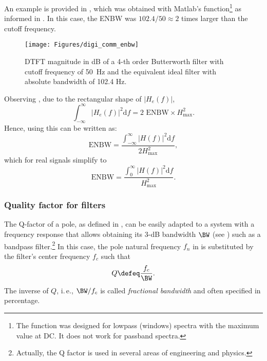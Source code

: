 An example is provided in , which was obtained with Matlab's function\footnote{The function  was designed for lowpass (windows) spectra with the maximum value at DC. It does not work for passband spectra.}  as informed in . In this case, the ENBW was $102.4/50 \approx 2$ times larger than the cutoff frequency. %



\begin{figure}
\centering
\texttt{[image: Figures/digi\_comm\_enbw]}
\caption{DTFT magnitude in dB of a 4-th order Butterworth filter with cutoff frequency of 50~Hz and the equivalent ideal filter with absolute bandwidth of 102.4 Hz.\label{fig:digi_comm_enbw}}
\end{figure}

Observing , due to the rectangular shape of 
$|H_e(f)|$, 
\[
\int_{-\infty}^{\infty} |H_e(f)|^2 \textrm{d}f = 2 \textrm{~ENBW} \times H_{\textrm{max}}^2.
\]
Hence, using  this can be written as:
\begin{equation}
\textrm{ENBW} = \frac{\int_{-\infty}^{\infty} |H(f)|^2 \textrm{d}f}{2H_{\textrm{max}}^2},
\label{eq:enbw}
\end{equation}
which for real signals simplify to
\begin{equation}
\textrm{ENBW} = \frac{\int_{0}^{\infty} |H(f)|^2 \textrm{d}f}{H_{\textrm{max}}^2}.
\end{equation}

\subsubsection{Quality factor for filters}
\label{sec:qForFilters}

The Q-factor of a pole, as defined in , can be easily adapted to a system with a frequency response that allows obtaining its 3-dB bandwidth $\BW$ (see ) such as a bandpass filter.\footnote{Actually, the Q factor is used in several areas of engineering and physics.} In this case, the pole natural frequency $f_n$ in  is substituted by the filter's center frequency $f_c$ such that
\begin{equation}
Q \defeq \frac{f_c}{ \BW}.
\label{eq:qFactorFilterDefinition}
\end{equation}
The inverse of $Q$, i.\,e.,  $\BW / f_c$ is called \emph{fractional bandwidth} and often specified in percentage.

